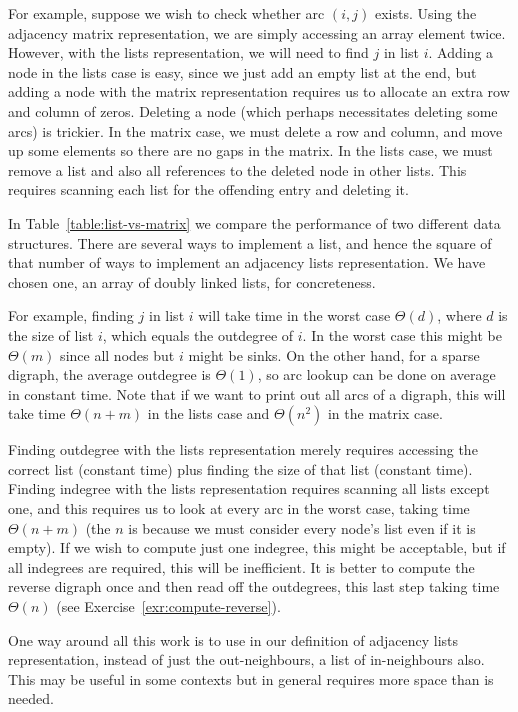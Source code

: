 For example, suppose we wish to check whether arc $(i,j)$ exists.
Using the adjacency matrix representation, we are simply accessing
an array element twice. However, with the lists representation, we
will need to find $j$ in list $i$. Adding a node in the lists case
is easy, since we just add  an empty list at the end, but adding a
node with the matrix representation requires us to allocate an extra
row and column of zeros. Deleting a node (which perhaps necessitates
deleting some arcs) is trickier. In the matrix case, we must delete
a row and column, and move up some elements so there are no gaps
in the matrix. In the lists case, we must remove a list and also
all references to the deleted node in other lists. This requires
scanning each list for the offending entry and deleting it.

In Table~\ref{table:list-vs-matrix} we compare the performance of two
different data structures. There are several ways to implement a list,
and hence the square of that number of ways to implement an adjacency
lists representation. We have chosen one, an array of doubly linked lists,
for concreteness.

For example, finding $j$ in list $i$ will take time in the worst case
$\Theta(d)$, where $d$ is the size of list $i$, which equals the outdegree
of $i$. In the worst case this might be $\Theta(m)$ since all nodes but
$i$ might be sinks. On the other hand, for a sparse digraph, the average
outdegree is $\Theta(1)$, so arc lookup can be done on average in constant
time. Note that if we want to print out all arcs of a digraph, this will take
time $\Theta(n+m)$ in the lists case and $\Theta(n^2)$ in the matrix case.

Finding outdegree with the lists representation merely requires accessing
the correct list (constant time) plus finding the size of  that list
(constant time). Finding indegree with the  lists representation requires
scanning all lists except one, and this requires us to look at every arc in
the worst case, taking time $\Theta(n+m)$ (the $n$ is because we must
consider every node's list even if it is empty). If we wish to compute just
one indegree, this might be acceptable, but if all indegrees are required,
this will be inefficient. It is better to compute the reverse digraph once
and then read off the outdegrees, this last step taking time $\Theta(n)$ 
(see Exercise~\ref{exr:compute-reverse}).

One way around all this work is to use in
our definition of adjacency lists representation, instead of just the
out-neighbours, a list of in-neighbours also. This may be useful in some
contexts but in general requires more space than is needed.

